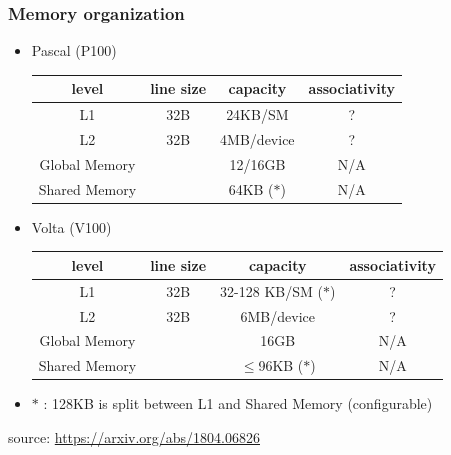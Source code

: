\documentclass[12pt,dvipdfmx]{beamer}
\begin{document}
\begin{frame}
  \frametitle{Memory organization}

  \begin{itemize}
\item Pascal (P100)

  \begin{center}
    {\small
\begin{tabular}{|c|c|c|c|}\hline
level         & line size & capacity      & associativity \\\hline
L1            & 32B       & 24KB/SM       & ? \\  
L2            & 32B       & 4MB/device    & ? \\
Global Memory &           & 12/16GB       & N/A \\\hline\hline
Shared Memory &           & 64KB ($\ast$) & N/A \\\hline
\end{tabular}}
\end{center}

\item Volta (V100)

  \begin{center}
        {\small
\begin{tabular}{|c|c|c|c|}\hline
level           & line size & capacity              & associativity \\\hline
  L1            & 32B       & 32-128 KB/SM ($\ast$) & ? \\  
  L2            & 32B       & 6MB/device            & ? \\
  Global Memory &           & 16GB                  & N/A \\\hline\hline
  Shared Memory &           & $\leq$96KB ($\ast$)   & N/A \\\hline
\end{tabular}}
\end{center}
\item [] $\ast$ : 128KB is split between L1 and Shared Memory (configurable)
\end{itemize}

source: \url{https://arxiv.org/abs/1804.06826}
\end{frame}
\end{document}
